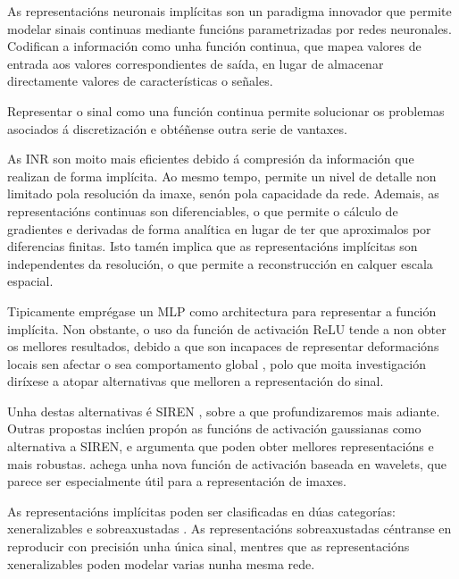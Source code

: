  As representacións neuronais implícitas son un paradigma innovador que permite modelar sinais continuas mediante funcións parametrizadas por redes neuronales.
 Codifican a información como unha función continua, que mapea valores de entrada aos valores correspondientes de saída, en lugar de almacenar directamente valores de características o señales.

Representar o sinal como una función continua permite solucionar os problemas asociados á discretización e obtéñense outra serie de vantaxes.

As INR son moito mais eficientes debido á compresión da información que realizan de forma implícita. Ao mesmo tempo, permite un nivel de detalle non limitado pola resolución da imaxe, senón pola capacidade da rede. 
 Ademais, as representacións continuas son diferenciables, o que permite o cálculo de gradientes e derivadas de forma analítica en lugar de ter que aproximalos por diferencias finitas.
 Isto tamén implica que as representacións implícitas son independentes da resolución, o que permite a reconstrucción en calquer escala espacial.
 
Tipicamente emprégase un MLP como architectura para representar a función implícita. Non obstante, o uso da función de activación ReLU tende a non obter os mellores resultados, debido a que son incapaces de representar deformacións locais sen afectar o sea comportamento global \cite{rahaman2019spectralbiasneuralnetworks},
polo que moita investigación diríxese a atopar alternativas que melloren a representación do sinal. \cite{essakine2024standimplicitneuralrepresentations}

Unha destas alternativas é SIREN \cite{sitzmann2020implicitneuralrepresentationsperiodic}, sobre a que profundizaremos mais adiante.
Outras propostas inclúen \cite{ramasinghe2022periodicityunifyingframeworkactivations} propón as funcións de activación gaussianas como alternativa a SIREN, e argumenta que poden obter mellores representacións e mais robustas.
\cite{saragadam2023wirewaveletimplicitneural} achega unha nova función de activación baseada en wavelets, que parece ser especialmente útil para a representación de imaxes.

As representacións implícitas poden ser clasificadas en dúas categorías: xeneralizables e sobreaxustadas \cite{yu2024neuraltrajectorymodelimplicit}. 
As representacións sobreaxustadas céntranse en reproducir con precisión unha única sinal, mentres que as representacións xeneralizables poden modelar varias nunha mesma rede.

